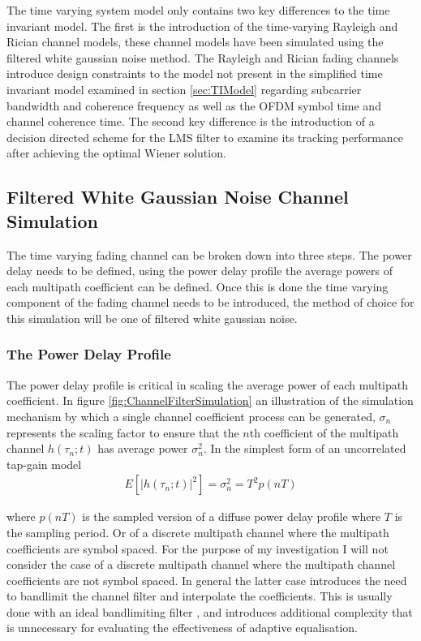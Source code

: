 The time varying system model only contains two key differences to the %
time invariant model. The first is the introduction of the time-varying Rayleigh %
and Rician channel models, these channel models have been simulated using %
the filtered white gaussian noise method. The Rayleigh and Rician fading %
channels introduce design constraints to the model not present in the %
simplified time invariant model examined in section %
\ref{sec:TIModel} regarding subcarrier bandwidth and coherence %
frequency as well as the OFDM symbol time and channel %
coherence time. The second key difference is the introduction %
of a decision directed scheme for the LMS %
filter to examine its tracking performance after achieving %
the optimal Wiener solution.

\subsection{Filtered White Gaussian Noise Channel Simulation}

The time varying fading channel can be broken down into three %
steps. The power delay needs to be defined, using the %
power delay profile the average powers of each multipath %
coefficient can be defined. Once this is done the time varying %
component of the fading channel needs to be introduced, %
the method of choice for this simulation will be one of filtered %
white gaussian noise. 
\subsubsection{The Power Delay Profile}

The power delay profile is critical in scaling the average power %
of each multipath coefficient. In figure \ref{fig:ChannelFilterSimulation} %
an illustration of the simulation mechanism by which a single channel %
coefficient process can be generated, $\sigma_{n}$ represents %
the scaling factor to ensure that the $n\text{th}$ coefficient %
of the multipath channel $h(\tau_{n};t)$ has average power %
$\sigma_{n}^{2}$. In the simplest form of an uncorrelated %
tap-gain model \cite{Jer00} 
\begin{align}
	E\left[\lvert h(\tau_{n};t) \rvert^{2} \right] = %
	\sigma_{n}^{2} = T^{2}p(nT)
	\label{eq:TapPower}
\end{align}

where $p(nT)$ is the sampled version of a diffuse power %
delay profile where $T$ is the sampling period. Or of a %
discrete multipath channel where the multipath coefficients %
are symbol spaced. For the purpose of my investigation I %
will not consider the case of a discrete multipath channel %
where the multipath channel coefficients are not symbol %
spaced. In general the latter case introduces the need %
to bandlimit the channel filter and interpolate the coefficients. %
This is usually done with an ideal bandlimiting filter %
\cite{Jer00}, and introduces additional complexity that %
is unnecessary for evaluating the effectiveness of %
adaptive equalisation.

